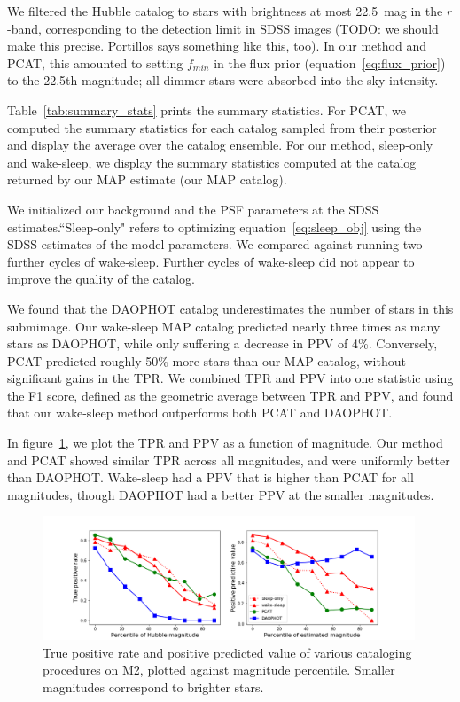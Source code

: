 We filtered the Hubble catalog to stars with brightness at most 22.5~mag in the $r$-band, corresponding to the detection limit in SDSS images  
(TODO: we should make this precise. Portillos says something like this, too). In our method and PCAT, this amounted to setting $f_{min}$ in the flux prior (equation~\eqref{eq:flux_prior})
to the 22.5th magnitude; all dimmer stars were absorbed into the sky intensity. 

Table~\ref{tab:summary_stats} prints the summary statistics. For PCAT, we 
computed the summary statistics for each catalog sampled from their posterior and display the average over the catalog ensemble. For our method, sleep-only and wake-sleep, we display the 
summary statistics computed at the catalog returned by our MAP estimate (our MAP catalog). 

We initialized our background and the PSF parameters at the SDSS estimates.``Sleep-only" refers 
to optimizing equation~\eqref{eq:sleep_obj} using the SDSS estimates of the model parameters. We compared against running two further cycles of wake-sleep. Further cycles of wake-sleep did not appear to improve the quality of the catalog. 

We found that the DAOPHOT catalog underestimates the number of stars in this submimage.
Our wake-sleep MAP catalog predicted nearly three times as many stars as DAOPHOT, while only suffering a decrease in PPV of 4\%. 
Conversely, PCAT predicted roughly 50\% more stars than our MAP catalog, without significant gains in the TPR. 
We combined TPR and PPV into one statistic using the F1 score,
defined as the geometric average between TPR and PPV, and found that our wake-sleep method outperforms both PCAT and DAOPHOT.



In figure~\ref{fig:summary_stats}, we plot the TPR and PPV as a function of magnitude.
Our method and PCAT showed similar TPR across all magnitudes, and were
uniformly better than DAOPHOT. Wake-sleep had a PPV that is higher than PCAT for all magnitudes, though DAOPHOT had a better PPV at the smaller magnitudes.

\begin{figure}[h]
    \centering
    \includegraphics[width=0.99\textwidth]{figures/summary_statistics_m2.png}
    \caption{True positive rate and positive predicted value of various cataloging
    procedures on M2, plotted against magnitude percentile.
    Smaller magnitudes correspond to brighter stars. }
    \label{fig:summary_stats}
\end{figure}

